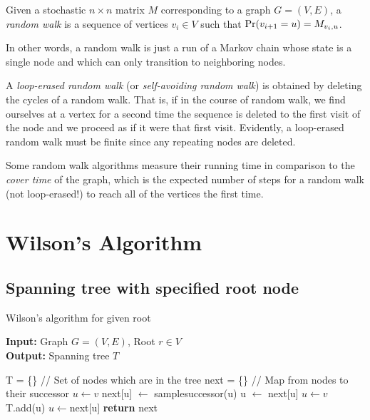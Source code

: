 \documentclass[11pt]{article}
\begin{document}
\begin{defn}
Given a stochastic $n\times n$ matrix $M$ corresponding to a graph $G = (V, E)$,
a \emph{random walk} is a sequence of vertices $v_i \in V$ such that
$\text{Pr}(v_{i+1} = u) = M_{v_i,u}$.
\end{defn}

In other words, a random walk is just a run of a Markov chain whose state is a
single node and which can only transition to neighboring nodes.

A \emph{loop-erased random walk} (or \emph{self-avoiding random walk}) is
obtained by deleting the cycles of a random walk. That is, if in the course of
random walk, we find ourselves at a vertex for a second time the sequence is
deleted to the first visit of the node and we proceed as if it were that first
visit. Evidently, a loop-erased random walk must be finite since any repeating
nodes are deleted.

Some random walk algorithms measure their running time in
comparison to the \emph{cover time} of the graph, which is the expected number
of steps for a random walk (not loop-erased!) to reach all of the vertices the
first time.


\section{Wilson's Algorithm}\label{wilson}
\subsection{Spanning tree with specified root node}
\begin{algorithm}
\caption{Wilson's algorithm for given root}
\label{alg:root}
\textbf{Input: }Graph $G=(V,E)$, Root $r \in V$ \\
\textbf{Output: }Spanning tree $T$
\begin{algorithmic}[1]
\STATE T = \{\}                   // Set of nodes which are in the tree
\STATE next = \{\}                // Map from nodes to their successor
\STATE $u \leftarrow v$
\label{walk}
\STATE next[u] $\leftarrow$ samplesuccessor(u)
\STATE u $\leftarrow$ next[u]
\ENDWHILE \label{endwalk}
\STATE $u \leftarrow v$
 \label{adjoin}
\STATE T.add(u)
\STATE $u \leftarrow $next[u]
\ENDWHILE \label{endadjoin}
\ENDFOR
\STATE \textbf{return} next
\end{algorithmic}
\end{algorithm}
\end{document}

